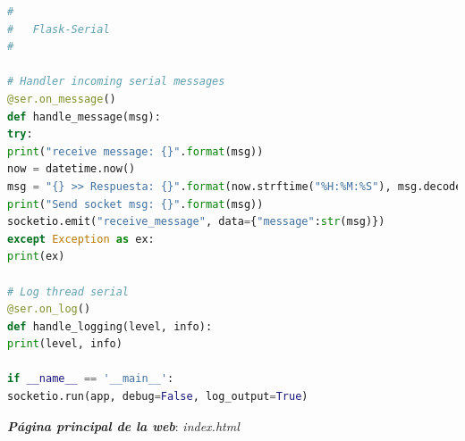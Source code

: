 \documentclass[12pt]{article}
\begin{document}
\begin{lstlisting}[language=python]
#
#   Flask-Serial
#

# Handler incoming serial messages
@ser.on_message()
def handle_message(msg):
try:
print("receive message: {}".format(msg))
now = datetime.now()
msg = "{} >> Respuesta: {}".format(now.strftime("%H:%M:%S"), msg.decode("utf-8").strip('\n'))
print("Send socket msg: {}".format(msg))
socketio.emit("receive_message", data={"message":str(msg)})
except Exception as ex:
print(ex)

# Log thread serial
@ser.on_log()
def handle_logging(level, info):
print(level, info)

if __name__ == '__main__':
socketio.run(app, debug=False, log_output=True)
	\end{lstlisting}

	\noindent \textit{\textbf{Página principal de la web}}: \textit{index.html}\\
	
\end{document}
